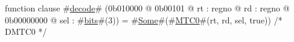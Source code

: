 function clause #\hyperref[zdecode]{decode}# (0b010000 @ 0b00101 @ rt : regno @ rd : regno @ 0b00000000 @ sel : #\hyperref[zbits]{bits}#(3)) =
  #\hyperref[zSome]{Some}#(#\hyperref[zMTCzero]{MTC0}#(rt, rd, sel, true))  /* DMTC0 */
